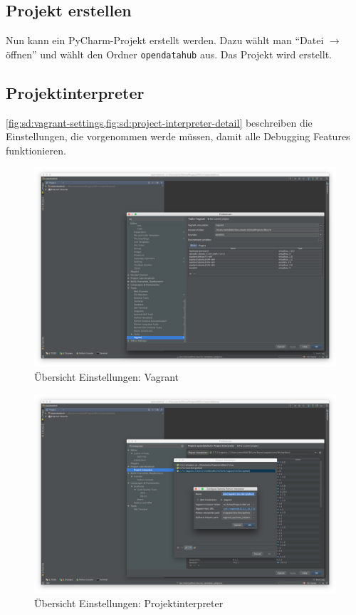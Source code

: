 \subsection{Projekt erstellen}
Nun kann ein PyCharm-Projekt erstellt werden. Dazu wählt man ``Datei $\to$ öffnen'' und wählt den Ordner \texttt{opendatahub} aus. Das Projekt wird erstellt. 

\subsection{Projektinterpreter}
\cref{fig:sd:vagrant-settings,fig:sd:project-interpreter-detail} beschreiben die Einstellungen, die vorgenommen werde müssen, damit alle Debugging Features funktionieren.
\begin{figure}[H]
	\centering
	\includegraphics[width=0.8\linewidth]{fig/vagrant_settings}
	\caption{Übersicht Einstellungen: Vagrant}
	\label{fig:sd:vagrant-settings}
\end{figure}
\begin{figure}[H]
	\centering
	\includegraphics[width=0.8\linewidth]{fig/project_interpreter_detail}
	\caption{Übersicht Einstellungen: Projektinterpreter}
	\label{fig:sd:project-interpreter-detail}
\end{figure}


